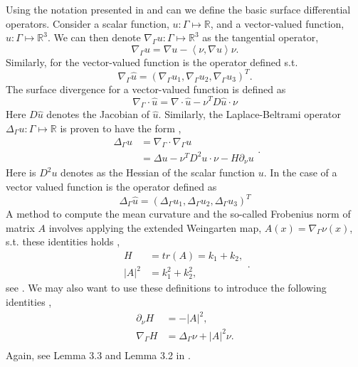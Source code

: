 Using the notation presented in \cite{dougan2012first} and \cite{kovacs2021convergent} can we define the basic surface differential operators. Consider a scalar function, $u: \Gamma \mapsto \mathbb{R} $, and a vector-valued function, $\hat{u}: \Gamma  \mapsto \mathbb{R} ^3$. We can then denote $ \nabla _{\Gamma } u: \Gamma \mapsto \mathbb{R} ^{3}$ as the tangential operator,
$$
\nabla_{\Gamma
} u  = \nabla u - \left<\nu, \nabla u \right> \nu.
$$
Similarly, for the vector-valued function is the operator defined s.t.
$$\nabla_{\Gamma } \hat{u} = \left( \nabla_{\Gamma } u_{1},\nabla_{\Gamma } u_{2},\nabla_{\Gamma } u_{3}   \right)^{T}.$$ The surface divergence for a vector-valued function is defined as \[
\nabla_{\Gamma } \cdot \hat{u} = \nabla  \cdot \hat{u} - \nu^{T} D \hat{u} \cdot \nu
\]
Here $D\hat{u}$ denotes the Jacobian of $\hat{u}$. Similarly, the Laplace-Beltrami operator $\Delta _{\Gamma }u  : \Gamma \mapsto \mathbb{R}$  is proven to have the form \cite[Lemma 1]{xu2003eulerian},
\begin{equation*}
    \begin{split}
 \Delta _{\Gamma } u  & = \nabla _{\Gamma } \cdot  \nabla _{\Gamma }u \\
 &=  \Delta u  - \nu ^{T} D^2 u \cdot \nu - H \partial _{\nu } u
    \end{split}
.\end{equation*}
Here is $D^2u$ denotes as the Hessian of the scalar function $u$. In the case of a vector valued function is the operator defined as \[
\Delta _{\Gamma } \hat{u} = \left( \Delta _{\Gamma } u_{1}, \Delta _{\Gamma } u_{2}, \Delta _{\Gamma } u_{3} \right)^{T}
\]
A method to compute the mean curvature and the so-called Frobenius norm of matrix $A$ involves applying the
extended Weingarten map, $ A\left( x \right) = \nabla_{\Gamma } \nu \left( x \right) $, s.t. these identities holds ,
\begin{equation*}
    \begin{split}
    H & = tr(A) = k_{1} + k_{2}, \\
    \left\lvert A \right\rvert^{2}  & = k_{1}^2 + k_{2}^2,
    \end{split}
.\end{equation*}
see \cite{kovacs2021convergent}.
We may also want to use these definitions to introduce the following identities ,
\[
    \begin{split}
         \partial _{\nu } H & = - \left\lvert A \right\rvert ^{2}, \\
    \nabla _{\Gamma } H & = \Delta  _{\Gamma } \nu  + \left\lvert A \right\rvert ^2 \nu.  \\
    \end{split}
\]
Again, see Lemma 3.3 and Lemma 3.2 in \cite{dougan2012first}.

